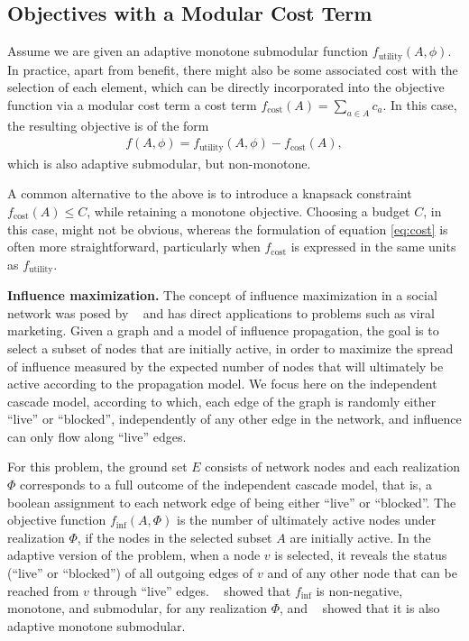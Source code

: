 \documentclass{article}
\newcommand{\citet}[1]{\citeauthor{#1}~\shortcite{#1}}
\renewcommand{\paragraph}[1]{\vspace{0.3em}\noindent\textbf{#1.}\makebox[0.5em]{}}
\begin{document}
\subsection{Objectives with a Modular Cost Term}
Assume we are given an adaptive monotone submodular function $f_{\textrm{utility}}(A, \phi)$.
In practice, apart from benefit, there might also be some associated cost with the selection of each element, which can be directly incorporated into the objective function via a modular cost term a cost term $f_{\textrm{cost}}(A) = \sum_{a \in A} c_a$.
In this case, the resulting objective is of the form
\begin{align} \label{eq:cost}
  f(A, \phi) = f_{\textrm{utility}}(A, \phi) - f_{\textrm{cost}}(A),
\end{align}
which is also adaptive submodular, but non-monotone.

A common alternative to the above is to introduce a knapsack constraint $f_{\textrm{cost}}(A) \leq C$, while retaining a monotone objective.
Choosing a budget $C$, in this case, might not be obvious, whereas the formulation of equation \eqref{eq:cost} is often more straightforward, particularly when $f_{\textrm{cost}}$ is expressed in the same units as $f_{\textrm{utility}}$.

\paragraph{Influence maximization}
The concept of influence maximization in a social network was posed by \citet{kempe03} and has direct applications to problems such as viral marketing.
Given a graph and a model of influence propagation, the goal is to select a subset of nodes that are initially active, in order to maximize the spread of influence measured by the expected number of nodes that will ultimately be active according to the propagation model.
We focus here on the independent cascade model, according to which, each edge of the graph is randomly either ``live'' or ``blocked'', independently of any other edge in the network, and influence can only flow along ``live'' edges.

For this problem, the ground set $E$ consists of network nodes and each realization $\Phi$ corresponds to a full outcome of the independent cascade model, that is, a boolean assignment to each network edge of being either ``live'' or ``blocked''.
The objective function $f_{\textrm{inf}}(A, \Phi)$ is the number of ultimately active nodes under realization $\Phi$, if the nodes in the selected subset $A$ are initially active.
In the adaptive version of the problem, when a node $v$ is selected, it reveals the status (``live'' or ``blocked'') of all outgoing edges of $v$ and of any other node that can be reached from $v$ through ``live'' edges.
\citet{kempe03} showed that $f_{\textrm{inf}}$ is non-negative, monotone, and submodular, for any realization $\Phi$, and \citet{golovin11} showed that it is also adaptive monotone submodular.
\end{document}

